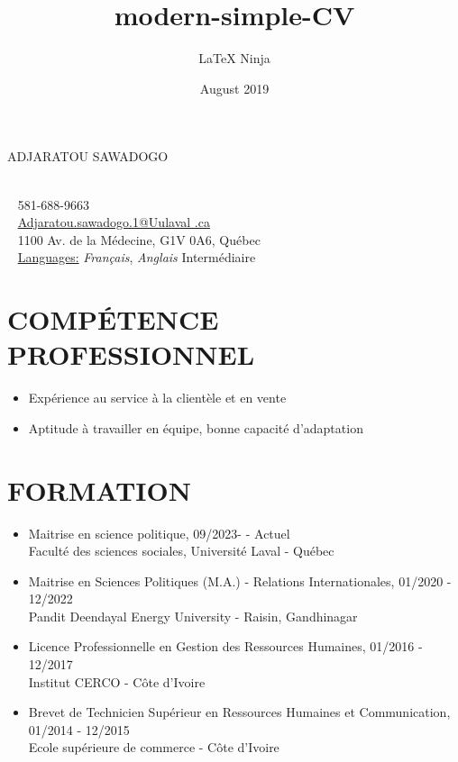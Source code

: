 \documentclass{modernsimplecv}
\title{modern-simple-CV}
\author{\LaTeX{} Ninja}
\date{August 2019}
\begin{document}
\thispagestyle{empty}







\begin{minipage}
    [t]{0.9\textwidth}
 \vspace{0pt} %
{\par\centering\huge{ADJARATOU
SAWADOGO}}\\
\faPhone~ 581-688-9663 \\
\faAt~ \protect\url{Adjaratou.sawadogo.1@Uulaval
.ca} \\
\faMapMarker~ 1100 Av. de la Médecine, G1V
0A6, Québec \\
\faCommentsO~ \underline{Languages:} \emph{Français}, \emph{Anglais} Intermédiaire
\end{minipage}

\section*{COMPÉTENCE PROFESSIONNEL}

 
\begin{itemize}
    \item Expérience au service à la clientèle et en vente
    \item Aptitude à travailler en équipe, bonne capacité d'adaptation
\end{itemize}



\section*{FORMATION}
\begin{itemize}
\item Maitrise en science politique, 09/2023- - Actuel\\
Faculté des sciences sociales, Université Laval - Québec


\item {Maitrise en Sciences Politiques (M.A.) - Relations Internationales,
01/2020 - 12/2022\\
Pandit Deendayal Energy University - Raisin, Gandhinagar}

\item {Licence Professionnelle en Gestion des Ressources Humaines,
01/2016 - 12/2017\\
Institut CERCO - Côte d'Ivoire}

\item {Brevet de Technicien Supérieur en Ressources Humaines et
Communication, 01/2014 - 12/2015\\
Ecole supérieure de commerce - Côte d'Ivoire}

\end{itemize}
\end{document}
